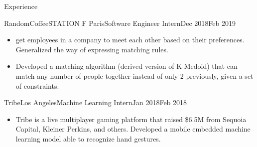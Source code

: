 \documentclass{resume}
\begin{document}
\begin{rSection}{Experience}
		\begin{job}{RandomCoffee}{STATION F Paris}{Software Engineer Intern}{Dec 2018}{Feb 2019}{
            \begin{itemize}
                \item {} get employees in a company to meet each other based on their preferences. Generalized the way of expressing matching rules.
                \item Developed a matching algorithm (derived version of K-Medoid) that can match any number of people together instead of only 2 previously, given a set of constraints.
            \end{itemize}
		}
		\end{job}

		\begin{job}{Tribe}{Los Angeles}{Machine Learning Intern}{Jan 2018}{Feb 2018}{
            \begin{itemize}
                \item Tribe is a live multiplayer gaming platform that raised \$6.5M from Sequoia Capital, Kleiner Perkins, and others. Developed a mobile embedded machine learning model able to recognize hand gestures.
            \end{itemize}
		}
		\end{job}
	\end{rSection}
\end{document}
